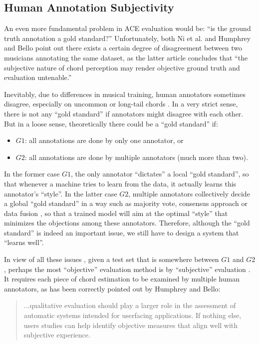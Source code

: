 \subsection{Human Annotation Subjectivity} \label{sec:2-subjectivity}
An even more fundamental problem in ACE evaluation would be: ``is the ground truth annotation a gold standard?'' Unfortunately, both Ni et al. \cite{ni2013understanding} and Humphrey and Bello \cite{humphreyfour} point out there exists a certain degree of disagreement between two musicians annotating the same dataset, as the latter article concludes that ``the subjective nature of chord perception may render objective ground truth and evaluation untenable.''

Inevitably, due to differences in musical training, human annotators sometimes disagree, especially on uncommon or long-tail chords \cite{humphreyfour}. In a very strict sense, there is not any ``gold standard'' if annotators might disagree with each other. But in a loose sense, theoretically there could be a ``gold standard'' if:
\begin{itemize}
\item $G1$: all annotations are done by only one annotator, or
\item $G2$: all annotations are done by multiple annotators (much more than two).
\end{itemize}
In the former case $G1$, the only annotator ``dictates'' a local ``gold standard'', so that whenever a machine tries to learn from the data, it actually learns this annotator's ``style''. In the latter case $G2$, multiple annotators collectively decide a global ``gold standard'' in a way such as majority vote, consensus approach \cite{ni2013understanding} or data fusion \cite{koopsintegration,klein2004sensor}, so that a trained model will aim at the optimal ``style'' that minimizes the objections among these annotators. Therefore, although the ``gold standard'' is indeed an important issue, we still have to design a system that ``learns well''.

In view of all these issues \cite{humphreyfour,ni2013understanding}, given a test set that is somewhere between $G1$ and $G2$, perhaps the most ``objective'' evaluation method is by ``subjective'' evaluation \cite{harte2010towards}. It requires each piece of chord estimation to be examined by multiple human annotators, as has been correctly pointed out by Humphrey and Bello:
\begin{quote}
...qualitative evaluation should play a larger role in the assessment of automatic systems intended for userfacing applications. If nothing else, users studies can help identify objective measures that align well with subjective experience.
\end{quote}

